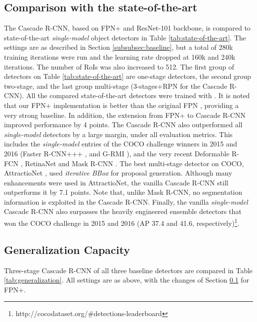 \documentclass[10pt,twocolumn,letterpaper]{article}
\begin{document}
\subsection{Comparison with the state-of-the-art}
\label{subsec:state-of-the-art}


The Cascade R-CNN, based on FPN+ and ResNet-101 backbone, is compared to state-of-the-art \emph{single-model} object detectors in Table \ref{tab:state-of-the-art}. The settings are as described in
Section \ref{subsubsec:baseline}, but a total of 280k training
iterations were run and the learning rate dropped at 160k and 240k
iterations. The number of RoIs was also increased to 512. The first group
of detectors on Table \ref{tab:state-of-the-art} are one-stage detectors,
the second group two-stage, and the last group multi-stage
(3-stages+RPN for the Cascade R-CNN). All the compared state-of-the-art detectors were trained with . It is noted that our FPN+ implementation is
better than the original FPN \cite{lin2017feature}, providing a very strong
baseline. In addition, the extension from FPN+ to Cascade R-CNN improved
performance by 4 points. The Cascade R-CNN also outperformed
all \emph{single-model} detectors by a large margin, under all evaluation metrics. This includes the \emph{single-model} entries of the COCO challenge winners in 2015 and 2016 (Faster R-CNN+++ \cite{DBLP:conf/cvpr/HeZRS16},
and G-RMI \cite{DBLP:journals/corr/HuangRSZKFFWSG016}), and the very recent
Deformable R-FCN \cite{dai2017deformable}, RetinaNet \cite{lin2017focal}
and Mask R-CNN \cite{he2017mask}. The best multi-stage detector on COCO,
AttractioNet \cite{DBLP:conf/bmvc/GidarisK16}, used \textit{iterative BBox} for proposal generation. Although many enhancements were used in AttractioNet, the vanilla Cascade R-CNN still outperforms it by 7.1 points. Note that, unlike Mask R-CNN, no segmentation information is exploited in the Cascade R-CNN. Finally, the vanilla \emph{single-model} Cascade R-CNN also surpasses the heavily engineered ensemble detectors that won the COCO challenge in 2015 and 2016 (AP 37.4 and 41.6, respectively)\footnote{http://cocodataset.org/\#detections-leaderboard}.

\subsection{Generalization Capacity}

Three-stage Cascade R-CNN of all three baseline detectors
are compared in Table \ref{tab:generalization}. All settings are as above,
with the changes of Section \ref{subsec:state-of-the-art} for FPN+.
\end{document}
